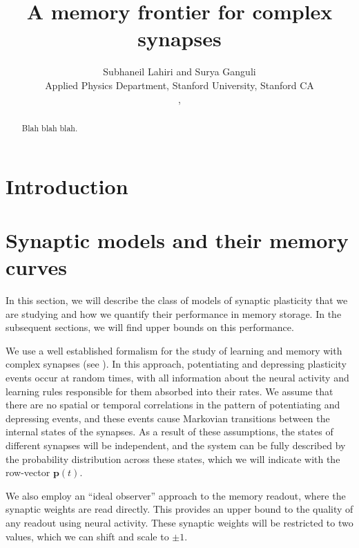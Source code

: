 \documentclass{article} %
\title{A memory frontier for complex synapses}
\author{Subhaneil Lahiri and Surya Ganguli\\
Applied Physics Department, Stanford University, Stanford CA\\
\emaillink{sulahiri@stanford.edu}, \emaillink{sulahiri@stanford.edu}
%
}
\newcommand{\pr}{\mathbf{p}}
\begin{document}
\maketitle




\begin{abstract}
  Blah blah blah.
\end{abstract}



\section{Introduction}\label{sec:intro}





\section{Synaptic models and their memory curves}\label{sec:setup}

In this section, we will describe the class of models of synaptic plasticity that we are studying and how we quantify their performance in memory storage.
In the subsequent sections, we will find upper bounds on this performance.

We use a well established formalism for the study of learning and memory with complex synapses (see \cite{Fusi2005cascade,Fusi2007multistate,Barrett2008discrete}).
In this approach, potentiating and depressing plasticity events occur at random times, with all information about the neural activity and learning rules responsible for them absorbed into their rates.
We assume that there are no spatial or temporal correlations in the pattern of potentiating and depressing events, and these events cause Markovian transitions between the internal states of the synapses.
As a result of these assumptions, the states of different synapses will be independent, and the system can be fully described by the probability distribution across these states, which we will indicate with the row-vector $\pr(t)$.

We also employ an ``ideal observer'' approach to the memory readout, where the synaptic weights are read directly.
This provides an upper bound to the quality of any readout using neural activity.
These synaptic weights will be restricted to two values, which we can shift and scale to $\pm1$.
\end{document}
